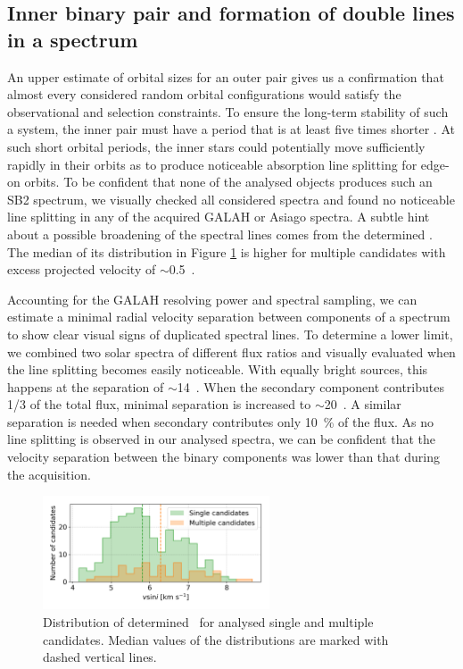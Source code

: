\subsection{Inner binary pair and formation of double lines in a spectrum}
\label{sec:orbits_sb2}
An upper estimate of orbital sizes for an outer pair gives us a confirmation that almost every considered random orbital configurations would satisfy the observational and selection constraints. To ensure the long-term stability of such a system, the inner pair must have a period that is at least five times shorter \citep{2006epbm.book.....E}. At such short orbital periods, the inner stars could potentially move sufficiently rapidly in their orbits as to produce noticeable absorption line splitting for edge-on orbits. To be confident that none of the analysed objects produces such an SB2 spectrum, we visually checked all considered spectra and found no noticeable line splitting in any of the acquired GALAH or Asiago spectra. A subtle hint about a possible broadening of the spectral lines comes from the determined \vsin. The median of its distribution in Figure \ref{fig:vsini_hist} is higher for multiple candidates with excess projected velocity of $\sim$0.5~\kms.

Accounting for the GALAH resolving power and spectral sampling, we can estimate a minimal radial velocity separation between components of a spectrum to show clear visual signs of duplicated spectral lines. To determine a lower limit, we combined two solar spectra of different flux ratios and visually evaluated when the line splitting becomes easily noticeable. With equally bright sources, this happens at the separation of $\sim$14~\kms. When the secondary component contributes 1/3 of the total flux, minimal separation is increased to $\sim$20~\kms. A similar separation is needed when secondary contributes only 10~\% of the flux. As no line splitting is observed in our analysed spectra, we can be confident that the velocity separation between the binary components was lower than that during the acquisition.

\begin{figure}
	\centering
	\includegraphics[width=0.6\textwidth]{hist_Vsini_cannon_ebv_c3_07.png}
	\caption{Distribution of determined \vsin\ for analysed single and multiple candidates. Median values of the distributions are marked with dashed vertical lines.}
	\label{fig:vsini_hist}
\end{figure}


